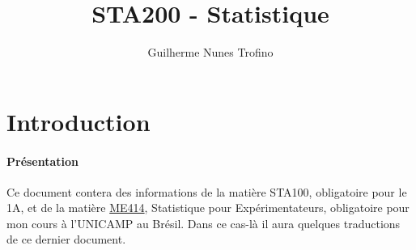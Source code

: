\documentclass{article}
\title{STA200 - Statistique}
\author{Guilherme Nunes Trofino}
\begin{document}
\maketitle

\newpage\tableofcontents

\section{Introduction}
\paragraph{Présentation}Ce document contera des informations de la matière STA100, obligatoire pour le 1A, et de la matière \href{https://github.com/tr0fin0/classes/tree/main/me414}{ME414}, Statistique pour Expérimentateurs, obligatoire pour mon cours à l'UNICAMP au Brésil. Dans ce cas-là il aura quelques traductions de ce dernier document.
\end{document}
